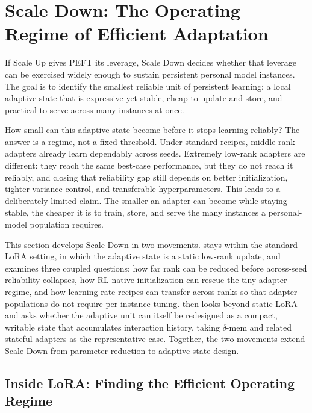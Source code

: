 \section{Scale Down: The Operating Regime of Efficient Adaptation}\label{sec:scale-down}

If Scale Up gives PEFT its leverage, Scale Down decides whether that leverage can be exercised widely enough to sustain persistent personal model instances. The goal is to identify the smallest reliable unit of persistent learning: a local adaptive state that is expressive yet stable, cheap to update and store, and practical to serve across many instances at once.

How small can this adaptive state become before it stops learning reliably? The answer is a regime, not a fixed threshold. Under standard recipes, middle-rank adapters already learn dependably across seeds. Extremely low-rank adapters are different: they reach the same best-case performance, but they do not reach it reliably, and closing that reliability gap still depends on better initialization, tighter variance control, and transferable hyperparameters. This leads to a deliberately limited claim. The smaller an adapter can become while staying stable, the cheaper it is to train, store, and serve the many instances a personal-model population requires.

This section develops Scale Down in two movements.  stays within the standard LoRA setting, in which the adaptive state is a static low-rank update, and examines three coupled questions: how far rank can be reduced before across-seed reliability collapses, how RL-native initialization can rescue the tiny-adapter regime, and how learning-rate recipes can transfer across ranks so that adapter populations do not require per-instance tuning.  then looks beyond static LoRA and asks whether the adaptive unit can itself be redesigned as a compact, writable state that accumulates interaction history, taking $\delta$-mem and related stateful adapters as the representative case. Together, the two movements extend Scale Down from parameter reduction to adaptive-state design.


\subsection{Inside LoRA: Finding the Efficient Operating Regime}\label{subsec:inside-lora}

